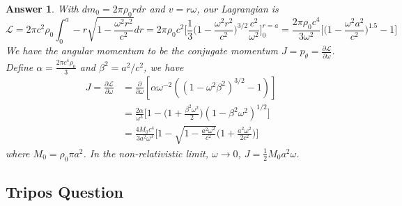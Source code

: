 \documentclass[a4paper]{article}
\newtheorem{ans}{Answer}[section]
\theoremstyle{new}
\begin{document}
\begin{ans}
With $dm_0=2\pi\rho_0rdr$ and $v=r\omega$, our Lagrangian is
$$\mathcal{L}=2\pi c^2\rho_0\int_0^a-r\sqrt{1-\frac{\omega^2r^2}{c^2}}dr=2\pi\rho_0c^2\bigg[\frac{1}{3}\bigg(1-\frac{\omega^2r^2}{c^2}\bigg)^{3/2}\frac{c^2}{\omega^2}\bigg]_0^{r=a}=\frac{2\pi\rho_0c^4}{3\omega^2}\bigg[\bigg(1-\frac{\omega^2a^2}{c^2}\bigg)^{1.5}-1\bigg]$$
We have the angular momentum to be the conjugate momentum $J=p_\theta=\frac{\partial\mathcal{L}}{\partial\omega}$. Define $\alpha=\frac{2\pi c^4\rho_0}{3}$ and $\beta^2=a^2/c^2$, we have
\begin{align}
    J=\frac{\partial\mathcal{L}}{\partial\omega}&=\frac{\partial}{\partial\omega}[\alpha\omega^{-2}((1-\omega^2\beta^2)^{3/2}-1)]\nonumber\\&=\frac{2\alpha}{\omega^3}\bigg[1-\bigg(1+\frac{\beta^2\omega^2}{2}\bigg)(1-\beta^2\omega^2)^{1/2}\bigg]\nonumber\\&=\frac{4M_0c^4}{3a^2\omega^3}\bigg[1-\sqrt{1-\frac{a^2\omega^2}{c^2}}\bigg(1+\frac{a^2\omega^2}{2c^2}\bigg)\bigg]\nonumber
\end{align}
where $M_0=\rho_0\pi a^2$. In the non-relativistic limit, $\omega\rightarrow 0$, $J=\frac{1}{2}M_0a^2\omega$.
\end{ans}
\newpage
\subsection*{Tripos Question}
\end{document}
